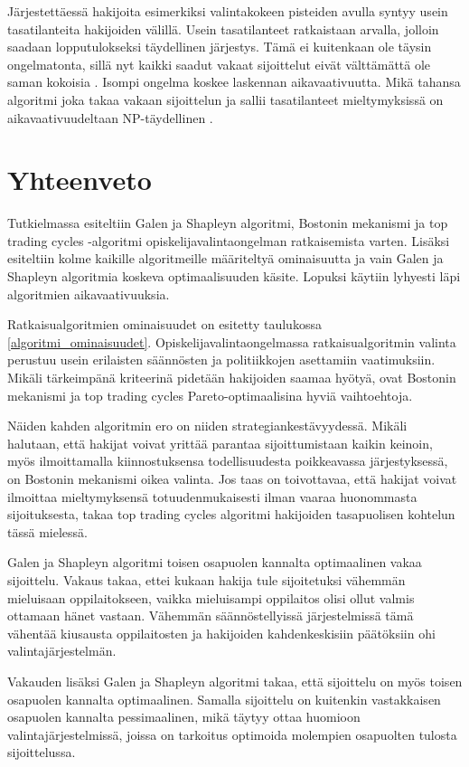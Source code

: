 \documentclass[twoside]{tktltiki}
\begin{document}
Järjestettäessä hakijoita esimerkiksi valintakokeen pisteiden avulla
syntyy usein tasatilanteita hakijoiden välillä. Usein tasatilanteet
ratkaistaan arvalla, jolloin saadaan lopputulokseksi täydellinen
järjestys. Tämä ei kuitenkaan ole täysin ongelmatonta, sillä nyt
kaikki saadut vakaat sijoittelut eivät välttämättä ole saman kokoisia
\cite{manlove02}. Isompi ongelma koskee laskennan aikavaativuutta.
Mikä tahansa algoritmi joka takaa vakaan sijoittelun ja sallii
tasatilanteet mieltymyksissä on aikavaativuudeltaan NP-täydellinen
\cite{manlove02}.

\section{Yhteenveto}

Tutkielmassa esiteltiin Galen ja Shapleyn algoritmi, Bostonin
mekanismi ja top trading cycles -algoritmi opiskelijavalintaongelman
ratkaisemista varten. Lisäksi esiteltiin kolme kaikille algoritmeille
määriteltyä ominaisuutta ja vain Galen ja Shapleyn algoritmia koskeva
optimaalisuuden käsite. Lopuksi käytiin lyhyesti läpi algoritmien
aikavaativuuksia.

Ratkaisualgoritmien ominaisuudet on esitetty taulukossa
\ref{algoritmi_ominaisuudet}. Opiskelijavalintaongelmassa
ratkaisualgoritmin valinta perustuu usein erilaisten säännösten ja
politiikkojen asettamiin vaatimuksiin. Mikäli tärkeimpänä kriteerinä
pidetään hakijoiden saamaa hyötyä, ovat Bostonin mekanismi ja top
trading cycles Pareto-optimaalisina hyviä vaihtoehtoja.

Näiden kahden algoritmin ero on niiden strategiankestävyydessä. Mikäli
halutaan, että hakijat voivat yrittää parantaa sijoittumistaan kaikin
keinoin, myös ilmoittamalla kiinnostuksensa todellisuudesta
poikkeavassa järjestyksessä, on Bostonin mekanismi oikea valinta. Jos
taas on toivottavaa, että hakijat voivat ilmoittaa mieltymyksensä
totuudenmukaisesti ilman vaaraa huonommasta sijoituksesta, takaa top
trading cycles algoritmi hakijoiden tasapuolisen kohtelun tässä
mielessä.

Galen ja Shapleyn algoritmi toisen osapuolen kannalta optimaalinen
vakaa sijoittelu. Vakaus takaa, ettei kukaan hakija tule sijoitetuksi
vähemmän mieluisaan oppilaitokseen, vaikka mieluisampi oppilaitos
olisi ollut valmis ottamaan hänet vastaan. Vähemmän säännöstellyissä
järjestelmissä tämä vähentää kiusausta oppilaitosten ja hakijoiden
kahdenkeskisiin päätöksiin ohi valintajärjestelmän.

Vakauden lisäksi Galen ja Shapleyn algoritmi takaa, että sijoittelu on
myös toisen osapuolen kannalta optimaalinen. Samalla sijoittelu on
kuitenkin vastakkaisen osapuolen kannalta pessimaalinen, mikä täytyy
ottaa huomioon valintajärjestelmissä, joissa on tarkoitus optimoida
molempien osapuolten tulosta sijoittelussa.
\end{document}
